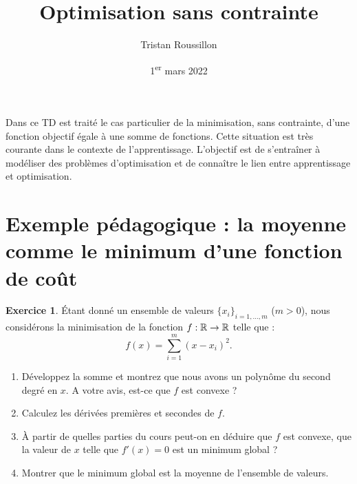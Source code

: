 \documentclass[a4paper,francais]{article}
\title{Optimisation sans contrainte}
\author{Tristan Roussillon}
\date{1\textsuperscript{er} mars 2022}
\newcommand{\R}{{\ensuremath\mathbb{R}}}
\theoremstyle{definition}
\newtheorem{exercice}{Exercice}[section]
\begin{document}
\maketitle

Dans ce TD est traité le cas particulier de la minimisation, sans contrainte,
d'une fonction objectif égale à une somme de fonctions. Cette situation est
très courante dans le contexte de l'apprentissage. L'objectif est de s'entraîner
à modéliser des problèmes d'optimisation et de connaître le lien entre apprentissage
et optimisation. 

\section{Exemple pédagogique : la moyenne comme le minimum d'une fonction de coût}
\label{sec:moyenne}

\begin{exercice}
  \'Etant donné un ensemble de valeurs $\{x_i\}_{i = 1,\dots,m}$ ($m > 0$),
  nous considérons la minimisation de la fonction $f : \R \rightarrow \R$ telle que :
  \[ f(x) = \sum_{i=1}^m (x-x_i)^2. \] 
  
  \begin{enumerate}
  \item Développez la somme et montrez que nous avons un polynôme du second degré en $x$.
    A votre avis, est-ce que $f$ est convexe ?
  \item Calculez les dérivées premières et secondes de $f$.
  \item \`A partir de quelles parties du cours peut-on en déduire que $f$ est convexe,
    que la valeur de $x$ telle que $f'(x) = 0$ est un minimum global ?
  \item Montrer que le minimum global est la moyenne de l'ensemble de valeurs.
  \end{enumerate}
\end{exercice}
\end{document}
